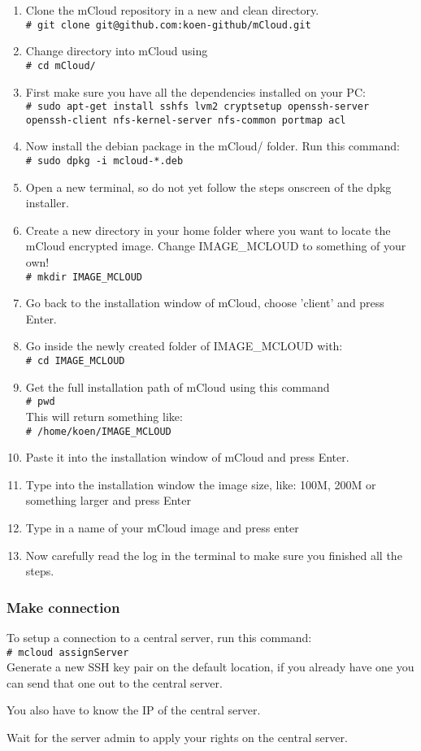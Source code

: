 \documentclass{article}
\newcommand{\shellcmd}[1]{\\\indent\indent\texttt{\footnotesize\# #1}\\}
\begin{document}
\begin{enumerate}
    \item Clone the mCloud repository in a new and clean directory.
    \shellcmd{git clone git@github.com:koen-github/mCloud.git}
    \item Change directory into mCloud using
    \shellcmd{cd mCloud/}
    \item First make sure you have all the dependencies installed on your PC:
    \shellcmd{sudo apt-get install sshfs lvm2 cryptsetup openssh-server openssh-client nfs-kernel-server nfs-common portmap acl}
    \item Now install the debian package in the mCloud/ folder. Run this command:
    \shellcmd{sudo dpkg -i mcloud-*.deb}
    
    \item Open a new terminal, so do not yet follow the steps onscreen of the dpkg installer.
    
    \item Create a new directory in your home folder where you want to locate the mCloud encrypted image.
    Change IMAGE\_MCLOUD to something of your own!
    \shellcmd{mkdir IMAGE\_MCLOUD}
    
    \item Go back to the installation window of mCloud, choose 'client' and press Enter.
    \item Go inside the newly created folder of IMAGE\_MCLOUD with: \shellcmd{cd IMAGE\_MCLOUD}
    
    \item Get the full installation path of mCloud using this command \shellcmd{pwd} This will return something like: 
    \shellcmd{/home/koen/IMAGE\_MCLOUD}
    
    \item Paste it into the installation window of mCloud and press Enter.
    
    \item Type into the installation window the image size, like: 100M, 200M or something larger and press Enter
    
    \item Type in a name of your mCloud image and press enter
    
    \item Now carefully read the log in the terminal to make sure you finished all the steps. 
\end{enumerate}

\subsubsection{Make connection}
To setup a connection to a central server, run this command:  \shellcmd{mcloud assignServer} 

Generate a new SSH key pair on the default location, if you already have one you can send that one out to the central server.

You also have to know the IP of the central server. 

Wait for the server admin to apply your rights on the central server.
\end{document}

